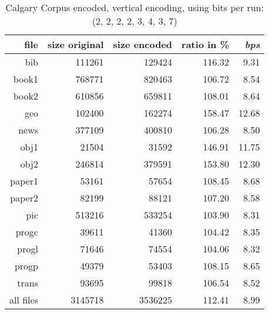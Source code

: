 \begin{table}[h]
	\centering
	\begin{tabular}{r|r|r|r|r}	
		file & size original & size encoded & ratio in \% & \textit{bps}\\
		\hline
bib & 111261 & 129424 & 116.32 & 9.31 \\
book1 & 768771 & 820463 & 106.72 & 8.54 \\
book2 & 610856 & 659811 & 108.01 & 8.64 \\
geo & 102400 & 162274 & 158.47 & 12.68 \\
news & 377109 & 400810 & 106.28 & 8.50 \\
obj1 & 21504 & 31592 & 146.91 & 11.75 \\
obj2 & 246814 & 379591 & 153.80 & 12.30 \\
paper1 & 53161 & 57654 & 108.45 & 8.68 \\
paper2 & 82199 & 88121 & 107.20 & 8.58 \\
pic & 513216 & 533254 & 103.90 & 8.31 \\
progc & 39611 & 41360 & 104.42 & 8.35 \\
progl & 71646 & 74554 & 104.06 & 8.32 \\
progp & 49379 & 53403 & 108.15 & 8.65 \\
trans & 93695 & 99818 & 106.54 & 8.52 \\
		\hline
		all files & 3145718 & 3536225 & 112.41 & 8.99
	\end{tabular}
	\caption{Calgary Corpus encoded, vertical encoding, using bits per run: (2, 2, 2, 2, 3, 4, 3, 7)}
	\label{tab:t50:Calgary Corpus encoded, vertical encoding, using bits per run: (2, 2, 2, 2, 3, 4, 3, 7)}
\end{table}

